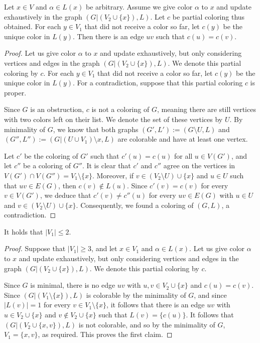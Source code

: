 \documentclass[11pt]{article}
\begin{document}
\begin{claim}\label{clm:improper}
Let $x \in V$ and $\alpha \in L(x)$ be arbitrary.
Assume we give color $\alpha$ to $x$ and update exhaustively in the graph $(G|(V_2\cup\{x\}),L)$. 
Let $c$ be partial coloring thus obtained.
For each $y \in V_1$ that did not receive a color so far, let $c(y)$ be the unique color in $L(y)$.
Then there is an edge $uv$ such that $c(u)=c(v)$.
\end{claim}
\begin{proof}
Let us give color $\alpha$ to $x$ and update exhaustively, but only considering vertices and edges in the graph $(G|(V_2\cup\{x\}),L)$.
We denote this partial coloring by $c$.
For each $y \in V_1$ that did not receive a color so far, let $c(y)$ be the unique color in $L(y)$.
For a contradiction, suppose that this partial coloring $c$ is proper.

Since $G$ is an obstruction, $c$ is not a coloring of $G$, meaning there are still vertices with two colors left on their list.
We denote the set of these vertices by $U$.
By minimality of $G$, we know that both graphs $(G',L'):=(G\setminus U,L)$ and $(G'',L''):=(G|(U\cup V_1) \setminus x,L)$ are colorable and have at least one vertex.

Let $c'$ be the coloring of $G'$ such that $c'(u)=c(u)$ for all $u \in V(G')$, and let $c''$ be a coloring of $G''$.
It is clear that $c'$ and $c''$ agree on the vertices in $V(G')\cap V(G'')=V_1\setminus \{x\}$.
Moreover, if $v \in (V_2 \setminus U) \cup \{x\}$ and $u \in U$ such that $uv \in E(G)$, then $c(v) \not \in L(u)$. 
Since $c'(v)=c(v)$ for every $v \in V(G')$, we deduce that $c'(v) \neq c''(u)$ for every $uv \in E(G)$ with
$u \in U$ and $v \in (V_2 \setminus U) \cup \{x\}$. 
Consequently, we found a coloring of $(G,L)$, a contradiction.
\end{proof}

\begin{claim}\label{clm:V1small}
It holds that $|V_1|\le 2$.
\end{claim}
\begin{proof}
Suppose that $|V_1| \geq 3$, and let $x \in V_1$ and $\alpha \in L(x)$.
Let us give color $\alpha$ to $x$ and update exhaustively, but only considering vertices and edges in the graph $(G|(V_2\cup\{x\}),L)$.
We denote this partial coloring by $c$.

Since $G$ is minimal, there is no edge $uv$ with $u,v \in V_2 \cup \{x\}$ and $c(u) = c(v)$.
Since $(G|(V_1 \setminus \{x\}),L)$ is colorable by the
minimality of $G$, and since $|L(v)|=1$ for every 
$v \in V_1 \setminus \{x\}$, it follows that there is an edge $uv$ with
$u \in V_2 \cup \{x\}$ and $v \not \in V_2 \cup \{x\}$ such that 
$L(v)=\{c(u)\}$. It follows that  
$(G|(V_2 \cup \{x,v\}),L)$ is not colorable, and so by the
minimality of $G$, $V_1=\{x,v\}$, as required. 
This proves the first claim.
\end{proof}
\end{document}
